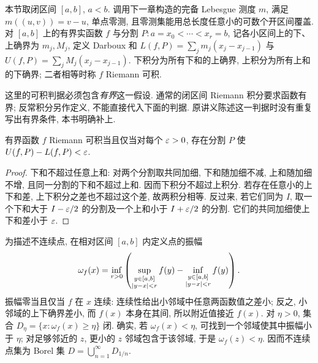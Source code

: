 本节取闭区间 $[a,b]$, $a<b$. 调用下一章构造的完备 Lebesgue 测度 $m$, 满足 $m((u,v))=v-u$, 单点零测, 且零测集能用总长度任意小的可数个开区间覆盖. 对 $[a,b]$ 上的有界实函数 $f$ 与分割 $P:a=x_0<\cdots<x_r=b$, 记各小区间上的下、上确界为 $m_j,M_j$, 定义 Darboux 和 $L(f,P)=\sum_jm_j(x_j-x_{j-1})$ 与 $U(f,P)=\sum_jM_j(x_j-x_{j-1})$. 下积分为所有下和的上确界, 上积分为所有上和的下确界; 二者相等时称 $f$ Riemann 可积.

这里的可积判据必须包含\emph{有界}这一假设. 通常的闭区间 Riemann 积分要求函数有界; 反常积分另作定义, 不能直接代入下面的判据. 原讲义陈述这一判据时没有重复写出有界条件, 本书明确补上.

\begin{lemma}[编者补充]\label{ra:c2:riemann-darboux}
有界函数 $f$ Riemann 可积当且仅当对每个 $\varepsilon>0$, 存在分割 $P$ 使 $U(f,P)-L(f,P)<\varepsilon$.
\end{lemma}
\begin{proof}
下和不超过任意上和: 对两个分割取共同加细, 下和随加细不减, 上和随加细不增, 且同一分割的下和不超过上和. 因而下积分不超过上积分. 若存在任意小的上下和差, 上下积分之差也不超过这个差, 故两积分相等. 反过来, 若它们同为 $I$, 取一个下和大于 $I-\varepsilon/2$ 的分割及一个上和小于 $I+\varepsilon/2$ 的分割. 它们的共同加细使上下和差小于 $\varepsilon$.
\end{proof}

为描述不连续点, 在相对区间 $[a,b]$ 内定义点的振幅
\[
 \omega_f(x)=\inf_{r>0}\left(
   \sup_{\substack{y\in[a,b]\\\lvert y-x\rvert<r}}f(y)
  -\inf_{\substack{y\in[a,b]\\\lvert y-x\rvert<r}}f(y)\right).
\]
振幅零当且仅当 $f$ 在 $x$ 连续: 连续性给出小邻域中任意两函数值之差小; 反之, 小邻域的上下确界差小, 而 $f(x)$ 本身在其间, 所以附近值接近 $f(x)$. 对 $\eta>0$, 集合 $D_\eta=\{x:\omega_f(x)\ge\eta\}$ 闭. 确实, 若 $\omega_f(x)<\eta$, 可找到一个邻域使其中振幅小于 $\eta$; 对足够邻近的 $z$, 更小的 $z$ 邻域包含于该邻域, 于是 $\omega_f(z)<\eta$. 因而不连续点集为 Borel 集 $D=\bigcup_{n=1}^{\infty}D_{1/n}$.

